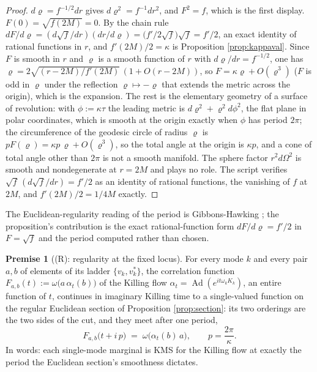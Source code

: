 \documentclass[11pt]{article}
\theoremstyle{definition}
\newtheorem{premise}[theorem]{Premise}
\begin{document}
\begin{proof}
$d\varrho = f^{-1/2}dr$ gives $d\varrho^{2} = f^{-1}dr^{2}$, and $F^{2} = f$, which is the first display. $F(0) = \sqrt{f(2M)} = 0$. By the chain rule $dF/d\varrho = (d\sqrt f/dr)(dr/d\varrho) = \bigl(f'/2\sqrt f\bigr)\sqrt f = f'/2$, an exact identity of rational functions in $r$, and $f'(2M)/2 = \kappa$ is Proposition \ref{prop:kappaval}. Since $F$ is smooth in $r$ and $\varrho$ is a smooth function of $r$ with $d\varrho/dr = f^{-1/2}$, one has $\varrho = 2\sqrt{(r - 2M)/f'(2M)}\,(1 + O(r - 2M))$, so $F = \kappa\varrho + O(\varrho^{3})$ ($F$ is odd in $\varrho$ under the reflection $\varrho \mapsto -\varrho$ that extends the metric across the origin), which is the expansion. The rest is the elementary geometry of a surface of revolution: with $\phi := \kappa\tau$ the leading metric is $d\varrho^{2} + \varrho^{2}d\phi^{2}$, the flat plane in polar coordinates, which is smooth at the origin exactly when $\phi$ has period $2\pi$; the circumference of the geodesic circle of radius $\varrho$ is $pF(\varrho) = \kappa p\,\varrho + O(\varrho^{3})$, so the total angle at the origin is $\kappa p$, and a cone of total angle other than $2\pi$ is not a smooth manifold. The sphere factor $r^{2}d\Omega^{2}$ is smooth and nondegenerate at $r = 2M$ and plays no role. The script verifies $\sqrt f\,(d\sqrt f/dr) = f'/2$ as an identity of rational functions, the vanishing of $f$ at $2M$, and $f'(2M)/2 = 1/4M$ exactly.
\end{proof}

The Euclidean-regularity reading of the period is Gibbons-Hawking \cite{GibbonsHawking1977, HartleHawking1976}; the proposition's contribution is the exact rational-function form $dF/d\varrho = f'/2$ in $F = \sqrt f$ and the period computed rather than chosen.

\begin{premise}[(R): regularity at the fixed locus]\label{prem:reg}
For every mode $k$ and every pair $a, b$ of elements of its ladder $\{v_k, v_k^{*}\}$, the correlation function $F_{a,b}(t) := \omega\bigl(a\,\alpha_t(b)\bigr)$ of the Killing flow $\alpha_t = \operatorname{Ad}(e^{it\omega_k K_k})$, an entire function of $t$, continues in imaginary Killing time to a single-valued function on the regular Euclidean section of Proposition \ref{prop:section}: its two orderings are the two sides of the cut, and they meet after one period,
\[
F_{a,b}\bigl(t + i\,p\bigr) \;=\; \omega\bigl(\alpha_t(b)\,a\bigr), \qquad p = \frac{2\pi}{\kappa} .
\]
In words: each single-mode marginal is KMS for the Killing flow at exactly the period the Euclidean section's smoothness dictates.
\end{premise}
\end{document}
